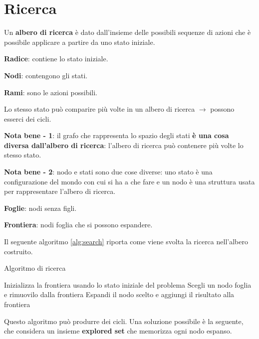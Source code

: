 \newpage

\section{Ricerca}

Un \textbf{albero di ricerca} è dato dall'insieme delle possibili sequenze di
azioni che è possibile applicare a partire da uno stato iniziale.

\textbf{Radice}: contiene lo stato iniziale.

\textbf{Nodi}: contengono gli stati.

\textbf{Rami}: sono le azioni possibili.

Lo stesso stato può comparire più volte in un albero di ricerca $\rightarrow$
possono esserci dei cicli.

\textbf{Nota bene - 1}: il grafo che rappresenta lo spazio degli stati \textbf{è una
cosa diversa dall'albero di ricerca}: l'albero di ricerca può contenere più volte
lo stesso stato.

\textbf{Nota bene - 2}: nodo e stati sono due cose diverse: uno stato è una
configurazione del mondo con cui si ha a che fare e un nodo è una struttura
usata per rappresentare l'albero di ricerca.

\textbf{Foglie}: nodi senza figli.

\textbf{Frontiera}: nodi foglia che si possono espandere.

Il seguente algoritmo \ref{alg:search} riporta come viene svolta la ricerca nell'albero
costruito. 

\begin{algorithm}
    \caption{Algoritmo di ricerca}
    \label{alg:search}
    \begin{algorithmic}[1] %
         
			\State Inizializza la frontiera usando lo stato iniziale del problema
            \Loop
              \EndIf
            \State Scegli un nodo foglia e rimuovilo dalla frontiera
              \EndIf
            \State Espandi il nodo scelto e aggiungi il risultato alla frontiera
			\EndLoop
        \EndProcedure
    \end{algorithmic}
\end{algorithm}

Questo algoritmo può produrre dei cicli. Una soluzione possibile è la seguente,
che considera un insieme \textbf{explored set} che memorizza ogni nodo espanso.

